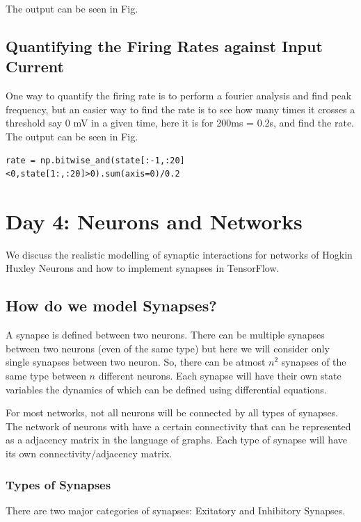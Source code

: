 \documentclass[10pt,letterpaper]{article}
\begin{document}
The output can be seen in Fig.

\subsection*{Quantifying the Firing Rates against Input Current}

One way to quantify the firing rate is to perform a fourier analysis and find peak frequency, but an easier way to find the rate is to see how many times it crosses a threshold say 0 mV in a given time, here it is for 200ms = 0.2s, and find the rate. The output can be seen in Fig.

\begin{verbatim}
rate = np.bitwise_and(state[:-1,:20]<0,state[1:,:20]>0).sum(axis=0)/0.2
\end{verbatim}

\section*{Day 4: Neurons and Networks}
We discuss the realistic modelling of synaptic interactions for networks of Hogkin Huxley Neurons and how to implement synapses in TensorFlow.

\subsection*{How do we model Synapses?}

A synapse is defined between two neurons. There can be multiple synapses between two neurons (even of the same type) but here we will consider only single synapses between two neuron. So, there can be atmost $n^2$ synapses of the same type between $n$ different neurons. Each synapse will have their own state variables the dynamics of which can be defined using differential equations. 

For most networks, not all neurons will be connected by all types of synapses. The network of neurons with have a certain connectivity that can be represented as a adjacency matrix in the language of graphs. Each type of synapse will have its own connectivity/adjacency matrix.

\subsubsection*{Types of Synapses}

There are two major categories of synapses: Exitatory and Inhibitory Synapses.
\end{document}
